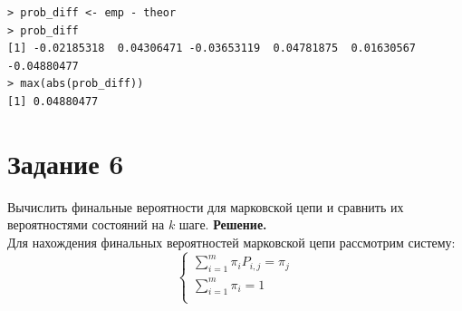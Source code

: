 \documentclass[14pt,a4paper]{scrartcl}
\begin{document}
\begin{verbatim}
> prob_diff <- emp - theor
> prob_diff
[1] -0.02185318  0.04306471 -0.03653119  0.04781875  0.01630567 -0.04880477
> max(abs(prob_diff))
[1] 0.04880477
\end{verbatim}


\section*{Задание 6}
Вычислить финальные вероятности для марковской цепи и сравнить их  вероятностями состояний на $k$ шаге.
\textbf{Решение.}\\

Для нахождения финальных вероятностей марковской цепи рассмотрим систему:
\begin{equation*}
	\begin{cases} 
		\sum\limits_{i=1}^m \pi_i P_{i,j} = \pi_j\\ 
		\sum\limits_{i=1}^m \pi_i = 1\\ 
	\end{cases}
\end{equation*}
\end{document}
